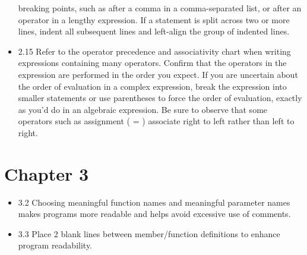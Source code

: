 \documentclass[11pt]{article}
\begin{document}
\begin{itemize}
breaking points, such as after a comma in a comma-separated list, or
after an operator in a lengthy expression. If a statement is split
across two or more lines, indent all subsequent lines and left-align
the group of indented lines.
\item 2.15 Refer to the operator precedence and associativity chart when
writing expressions containing many operators. Confirm that the
operators in the expression are performed in the order you
expect. If you are uncertain about the order of evaluation in a
complex expression, break the expression into smaller statements or
use parentheses to force the order of evaluation, exactly as you’d
do in an algebraic expression. Be sure to observe that some
operators such as assignment ( = ) associate right to left rather
than left to right.
\end{itemize}
\section{Chapter 3}
\label{sec-3}
\begin{itemize}
\item 3.2 Choosing meaningful function names and meaningful parameter
names makes programs more readable and helps avoid excessive use of
comments.
\item 3.3 Place 2 blank lines between member/function definitions to
enhance program readability.
\end{itemize}
\end{document}
